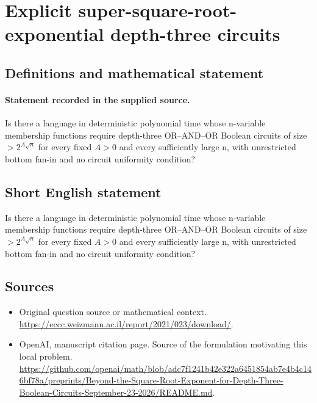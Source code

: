 \documentclass[11pt]{article}
\begin{document}
\section*{Explicit super-square-root-exponential depth-three circuits}\label{30007455}
\subsection{Definitions and mathematical statement}
\paragraph{Statement recorded in the supplied source.}
Is there a language in deterministic polynomial time whose n-variable membership functions require depth-three OR–AND–OR Boolean circuits of size $>2^{A\surd n}$ for every fixed $A>0$ and every sufficiently large n, with unrestricted bottom fan-in and no circuit uniformity condition?
\subsection{Short English statement}
Is there a language in deterministic polynomial time whose n-variable membership functions require depth-three OR–AND–OR Boolean circuits of size $>2^{A\surd n}$ for every fixed $A>0$ and every sufficiently large n, with unrestricted bottom fan-in and no circuit uniformity condition?
\subsection{Sources}
\begin{itemize}
\item[S1] Original question source or mathematical context.
\url{https://eccc.weizmann.ac.il/report/2021/023/download/}.
\item[S2] OpenAI, manuscript citation page. Source of the formulation motivating this local problem.
\url{https://github.com/openai/math/blob/adc7f1241b42e322a6451854ab7e4b4c146bf78a/preprints/Beyond-the-Square-Root-Exponent-for-Depth-Three-Boolean-Circuits-September-23-2026/README.md}.
\end{itemize}
\end{document}
